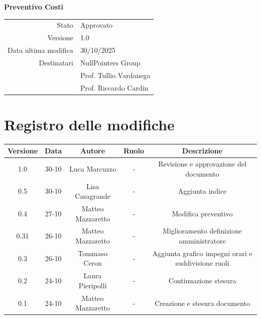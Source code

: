 \documentclass{article}
\begin{document}
	\vspace{2cm}
	
	{
		\centering
		\Huge\bfseries Preventivo Costi\par
		\vspace{0.5cm}
	}
	
	\begin{center}
		\begin{tabular}{r|l}
			Stato & Approvato \\
			Versione & 1.0 \\
			Data ultima modifica & 30/10/2025 \\
			Destinatari & NullPointers Group \\
			& Prof. Tullio Vardanega \\
			& Prof. Riccardo Cardin \\
		\end{tabular}
	\end{center}
	
	\newpage
	\tableofcontents
          \newpage
	\section{Registro delle modifiche}
	
	\begin{table}[htbp]
		\begin{tabular}{|c|c|c|c|c|}
			\hline
			\rowcolor[gray]{0.9}
			Versione & Data & Autore & Ruolo & Descrizione \\
			\hline
			1.0 & 30-10 & Luca Marcuzzo & - & Revisione e approvazione del documento \\
			\hline
			0.5 & 30-10 & Lisa Casagrande & - & Aggiunta indice \\ 
			\hline
			0.4 & 27-10 & Matteo Mazzaretto & - & Modifica preventivo \\ 
			\hline
			0.31 & 26-10 & Matteo Mazzaretto & - & Miglioramento definizione amministratore \\ 
			\hline
			0.3 & 26-10 & Tommaso Ceron & - & Aggiunta grafico impegni orari e suddivisione ruoli \\ 
			\hline
			0.2 & 24-10 & Laura Pieripolli & - & Continuazione stesura \\ 
			\hline
			0.1 & 24-10 & Matteo Mazzaretto & - & Creazione e stesura documento \\ 
			\hline
		\end{tabular}
	\end{table}
	
	\newpage
	
\end{document}
